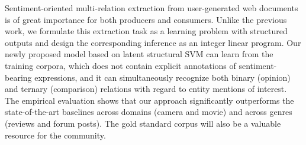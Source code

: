 Sentiment-oriented multi-relation extraction from user-generated web documents is of great importance for both producers and consumers. Unlike the previous work, we formulate this extraction task as a learning problem with structured outputs and design the corresponding inference as an integer linear program.  Our newly proposed model based on latent structural SVM can learn from the training corpora, which does not contain explicit annotations of sentiment-bearing expressions, and it can simultaneously recognize both binary (opinion) and ternary (comparison) relations with regard to entity mentions of interest. The empirical evaluation shows that our approach significantly outperforms the state-of-the-art baselines across domains (camera and movie) and across genres (reviews and forum posts). The gold standard corpus will also be a valuable resource for the community.
